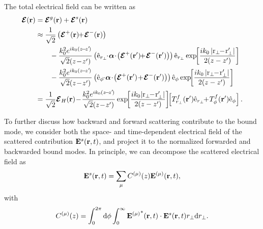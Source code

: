 The total electrical field can be written as 
\begin{align}
\boldsymbol{\mathcal{E}}(\br) &= \boldsymbol{\mathcal{E}}^g(\br) + \boldsymbol{\mathcal{E}}^s(\br)\\
&\approx  \frac{1}{\sqrt{2}} \left(\boldsymbol{\mathcal{E}}^+(\br)\!\! +\! \boldsymbol{\mathcal{E}}^-(\br) \right) \nonumber\\
&\qquad - \frac{k_0^2 e^{ik_0(z\!-\!z'\!)}}{\sqrt{2}(z\!-\!z')} \left(\hat{\mathrm{e}}_{r_\perp} \!\!\cdot\! \boldsymbol{\alpha}\!\cdot\! \left(\boldsymbol{\mathcal{E}}^+ (\br') \!\! +\! \boldsymbol{\mathcal{E}}^- (\br') \right)\right)\hat{\mathrm{e}}_{r_\perp}  \exp\!\! \left[ \frac{ik_0 \left| \mathrm{r}_\perp\!\! -\! \mathrm{r}_\perp'\right|}{2(z-z')}  \right] \nonumber\\
&\qquad - \frac{k_0^2 e^{ik_0(z\!-\!z'\!)}}{\sqrt{2}(z\!-\!z')} \left(\hat{\mathrm{e}}_{\phi} \!\!\cdot\! \boldsymbol{\alpha}\!\cdot\! \left(\boldsymbol{\mathcal{E}}^+ (\br') \! +\! \boldsymbol{\mathcal{E}}^- (\br') \right)\right)\hat{\mathrm{e}}_{\phi}  \exp\!\! \left[ \frac{ik_0 \left| \mathrm{r}_\perp\!\! -\! \mathrm{r}_\perp'\right|}{2(z-z')}  \right]\\
&= \frac{1}{\sqrt{2}} \boldsymbol{\mathcal{E}}_H(\br)  \!-\! \frac{k_0^2 e^{ik_0(z\!-\!z'\!)}}{\sqrt{2}(z\!-\!z')} \exp\!\! \left[ \frac{ik_0\! \left| \mathrm{r}_\perp\!\! -\! \mathrm{r}_\perp'\right|}{2(z-z')}  \right]\!\! \left[ T^f_{r_\perp}(\br') \hat{\mathrm{e}}_{r_\perp} \!\! +\! T^f_\phi (\br') \hat{\mathrm{e}}_{\phi} \right].
\end{align}

To further discuss how backward and forward scattering contribute to the bound mode, we consider both the space- and time-dependent electrical field of the scattered contribution $ \mathbf{E}^s(\mathbf{r},t) $, and project it to the normalized forwarded and backwarded bound modes.  In principle, we can decompose the scattered electrical field as 
\begin{align}
\mathbf{E}^s(\mathbf{r},t) =\sum_\mu C^{(\mu)}(z) \mathbf{E}^{(\mu)} (\mathbf{r},t),
\end{align}
with
\begin{align}
C^{(\mu)} (z) = \int_0^{2\pi}\mathrm{d}\phi \int_0^\infty {\mathbf{E}^{(\mu)}}^* (\mathbf{r},t) \cdot \mathbf{E}^s(\mathbf{r},t)r_\perp \mathrm{d}r_\perp.
\end{align}

